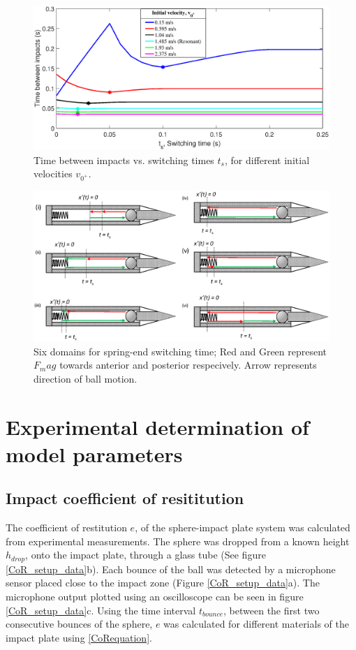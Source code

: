 \documentclass[letterpaper, 10 pt, conference]{ieeeconf}  %
\begin{document}
\begin{figure}
	\includegraphics[width=\linewidth]{delTvsTs_R2.eps}
	\caption{Time between impacts vs. switching times $t_s$, for different initial velocities $v_{0^+}$.}
	\label{delTvsTs}
\end{figure}

\begin{figure}
	\includegraphics[width=\linewidth]{Tswitch_cases_1to6.eps}
	\caption{Six domains for spring-end switching time; Red and Green represent $F_mag$ towards anterior and posterior respecively. Arrow represents direction of ball motion.}
	\label{Tswitch}
\end{figure}


\section{Experimental determination of model parameters}

\subsection{Impact coefficient of resititution}

The coefficient of restitution $e$, of the sphere-impact plate system was calculated from experimental measurements. The sphere was dropped from a known height $h_{drop}$, onto the impact plate, through a glass tube (See figure \ref{CoR_setup_data}b). Each bounce of the ball was detected by a microphone sensor placed close to the impact zone (Figure \ref{CoR_setup_data}a). The microphone output plotted using an oscilloscope can be seen in figure \ref{CoR_setup_data}c. Using the time interval $t_{bounce}$, between the first two consecutive bounces of the sphere, $e$ was calculated for different materials of the impact plate using \cref{CoRequation}. 
\end{document}
